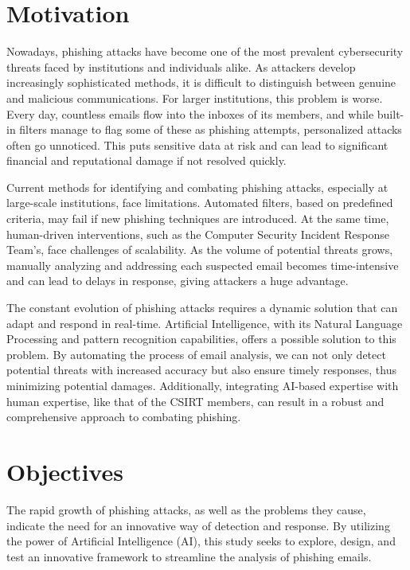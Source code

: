 \section{Motivation}

Nowadays, phishing attacks have become one of the most prevalent cybersecurity threats faced by institutions and individuals alike. As attackers develop increasingly sophisticated methods, it is difficult to distinguish between genuine and malicious communications. For larger institutions, this problem is worse. Every day, countless emails flow into the inboxes of its members, and while built-in filters manage to flag some of these as phishing attempts, personalized attacks often go unnoticed. This puts sensitive data at risk and can lead to significant financial and reputational damage if not resolved quickly.

Current methods for identifying and combating phishing attacks, especially at large-scale institutions, face limitations. Automated filters, based on predefined criteria, may fail if new phishing techniques are introduced. At the same time, human-driven interventions, such as the Computer Security Incident Response Team's, face challenges of scalability. As the volume of potential threats grows, manually analyzing and addressing each suspected email becomes time-intensive and can lead to delays in response, giving attackers a huge advantage.

The constant evolution of phishing attacks requires a dynamic solution that can adapt and respond in real-time. Artificial Intelligence, with its Natural Language Processing and pattern recognition capabilities, offers a possible solution to this problem. By automating the process of email analysis, we can not only detect potential threats with increased accuracy but also ensure timely responses, thus minimizing potential damages. Additionally, integrating AI-based expertise with human expertise, like that of the CSIRT members, can result in a robust and comprehensive approach to combating phishing.

\section{Objectives}

The rapid growth of phishing attacks, as well as the problems they cause, indicate the need for an innovative way of detection and response. By utilizing the power of Artificial Intelligence (AI), this study seeks to explore, design, and test an innovative framework to streamline the analysis of phishing emails.

